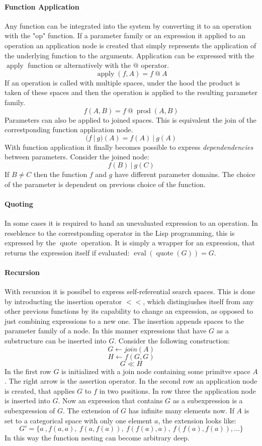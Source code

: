 \documentclass[english]{article}
\newcommand{\apply}{\operatorname{apply}}
\newcommand{\eval}{\operatorname{eval}}
\newcommand{\prot}{\operatorname{prod}}
\newcommand{\quot}{\operatorname{quote}}
\begin{document}
\paragraph{Function Application}
Any function can be integrated into the system by converting it to an operation with the "op" function. If a parameter family or an expression it applied to an operation an application node is created that simply represents the application of the underlying function to the arguments. Application can be expressed with the $\apply$ function or alternatively with the $@$ operator.
$$\apply(f, A) = f\ @\ A$$
If an operation is called with multiple spaces, under the hood the product is taken of these spaces and then the operation is applied to the resulting parameter family.
$$f(A,B) = f\ @\ \prot(A,B)$$
Parameters can also be applied to joined spaces. This is equivalent the join of the correstponding function application node.
$$(f\ |\ g)(A) = f(A)\ |\ g(A)$$
With function application it finally becomes possible to express \textit{dependendencies} between parameters. Consider the joined node:
$$f(B)\ |\ g(C)$$
If $B \neq C$ then the function $f$ and $g$ have different parameter domains. The choice of the parameter is dependent on previous choice of the function.

\paragraph{Quoting}
In some cases it is required to hand an unevaluated expression to an operation. In reseblence to the correstponding operator in the Lisp programming, this is expressed by the $\operatorname{quote}$ operation. It is simply a wrapper for an expression, that returns the expression itself if evaluated: $\eval(\quot(G)) = G$.

\paragraph{Recursion}
With recursion it is possibel to express self-referential search spaces. This is done by introducting the insertion operator $<<$, which distingiushes itself from any other previous functions by its capability to change an expression, as opposed to just combining expressions to a new one. The insertion appends spaces to the parameter family of a node. In this manner expressions that have $G$ as a substructure can be inserted into $G$. Consider the following construction:
$$G \leftarrow join(A)$$
$$H \leftarrow f(G, G)$$
$$ G  \ll H$$
In the first row $G$ is initialized with a join node containing some primitve space $A$. The right arrow is the assertion operator. In the second row an application node is created, that applies $G$ to $f$ in two positions. In row three the application node is inserted into $G$. Now an expression that contains $G$ as a subexpression is a subexpression of $G$.
The extension of $G$ has infinite many elements now. If $A$ is set to a categorical space with only one element $a$, the extension looks like:
$$ G' = \{a\ ,f(a,a),\ f(a,f(a)),\ f(f(a),a),\ f(f(a),f(a)), ...\}$$
In this way the function nesting can become arbitrary deep.
\end{document}
